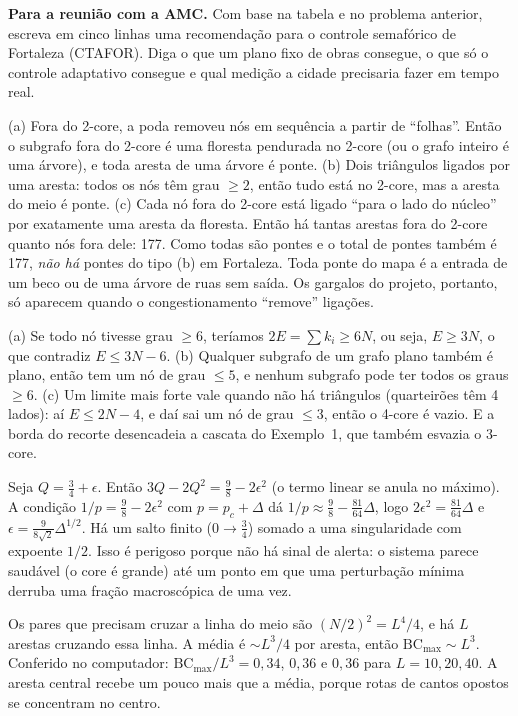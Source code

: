 \documentclass[11pt]{article}
\begin{document}
 \textbf{Para a reunião com a AMC.} Com base na tabela e no problema anterior, escreva em cinco linhas uma recomendação para o controle semafórico de Fortaleza (CTAFOR). Diga o que um plano fixo de obras consegue, o que só o controle adaptativo consegue e qual medição a cidade precisaria fazer em tempo real.

\solucoes

(a) Fora do 2-core, a poda removeu nós em sequência a partir de ``folhas''. Então o subgrafo fora do 2-core é uma floresta pendurada no 2-core (ou o grafo inteiro é uma árvore), e toda aresta de uma árvore é ponte. (b) Dois triângulos ligados por uma aresta: todos os nós têm grau $\ge2$, então tudo está no 2-core, mas a aresta do meio é ponte. (c) Cada nó fora do 2-core está ligado ``para o lado do núcleo'' por exatamente uma aresta da floresta. Então há tantas arestas fora do 2-core quanto nós fora dele: 177. Como todas são pontes e o total de pontes também é 177, \emph{não há} pontes do tipo (b) em Fortaleza. Toda ponte do mapa é a entrada de um beco ou de uma árvore de ruas sem saída. Os gargalos do projeto, portanto, só aparecem quando o congestionamento ``remove'' ligações.

(a) Se todo nó tivesse grau $\ge6$, teríamos $2E = \sum k_i\ge6N$, ou seja, $E\ge3N$, o que contradiz $E\le3N-6$. (b) Qualquer subgrafo de um grafo plano também é plano, então tem um nó de grau $\le5$, e nenhum subgrafo pode ter todos os graus $\ge6$. (c) Um limite mais forte vale quando não há triângulos (quarteirões têm 4 lados): aí $E\le2N-4$, e daí sai um nó de grau $\le3$, então o 4-core é vazio. E a borda do recorte desencadeia a cascata do Exemplo~1, que também esvazia o 3-core.

Seja $Q = \tfrac34+\epsilon$. Então $3Q-2Q^2 = \tfrac98-2\epsilon^2$ (o termo linear se anula no máximo). A condição $1/p = \tfrac98-2\epsilon^2$ com $p = p_c+\Delta$ dá $1/p\approx\tfrac98-\tfrac{81}{64}\Delta$, logo $2\epsilon^2 = \tfrac{81}{64}\Delta$ e $\epsilon = \tfrac{9}{8\sqrt2}\Delta^{1/2}$. Há um salto finito ($0\to\tfrac34$) somado a uma singularidade com expoente $1/2$. Isso é perigoso porque não há sinal de alerta: o sistema parece saudável (o core é grande) até um ponto em que uma perturbação mínima derruba uma fração macroscópica de uma vez.

Os pares que precisam cruzar a linha do meio são $(N/2)^2 = L^4/4$, e há $L$ arestas cruzando essa linha. A média é $\sim L^3/4$ por aresta, então $\mathrm{BC}_{\max}\sim L^3$. Conferido no computador: $\mathrm{BC}_{\max}/L^3 = 0{,}34$, $0{,}36$ e $0{,}36$ para $L = 10, 20, 40$. A aresta central recebe um pouco mais que a média, porque rotas de cantos opostos se concentram no centro.
\end{document}
